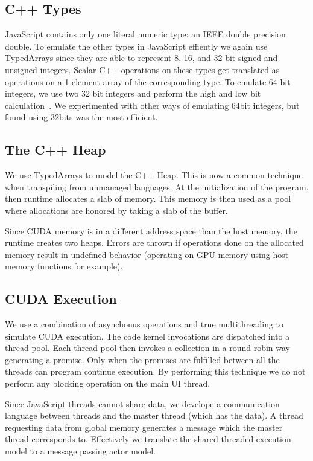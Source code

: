 \documentclass[nocopyrightspace]{sigchi}
\begin{document}
\subsection{C++ Types}

JavaScript contains only one literal numeric type: an IEEE double 
precision double. To emulate the other types in JavaScript effiently we
again use TypedArrays since they are able to represent 8, 16, and 32 bit
signed and unsigned integers. Scalar C++ operations on these types get
translated as operations on a 1 element array of the corresponding type.
To emulate 64 bit integers, we use two 32 bit integers and perform the
high and low bit calculation~\cite{warren2013hacker}.
We experimented with other ways of emulating 64bit integers, but found 
using 32bits was the most efficient.

\subsection{The C++ Heap}

We use TypedArrays to model the C++ Heap. This is now a common technique 
when transpiling from unmanaged languages. At the initialization of the 
program, then runtime allocates a slab of memory. This memory is then
used as a pool where allocations are honored by taking a slab of the 
buffer.

Since CUDA memory is in a different address space than the host memory,
the runtime creates two heaps. Errors are thrown if operations done on
the allocated memory result in undefined behavior (operating on GPU
memory using host memory functions for example).

\subsection{CUDA Execution}


We use a combination of asynchonus operations and true multithreading
to simulate CUDA execution. The code kernel invocations are dispatched
into a thread pool. Each thread pool then invokes a collection in a 
round robin way generating a promise. Only when the promises are fulfilled
between all the threads can program continue execution. By performing
this technique we do not perform any blocking operation on the main UI
thread.

Since JavaScript threads cannot share data, we develope a communication
language between threads and the master thread (which has the data). A
thread requesting data from global memory generates a message which the
master thread corresponds to. Effectively we translate the shared threaded
execution model to a message passing actor model.
\end{document}
